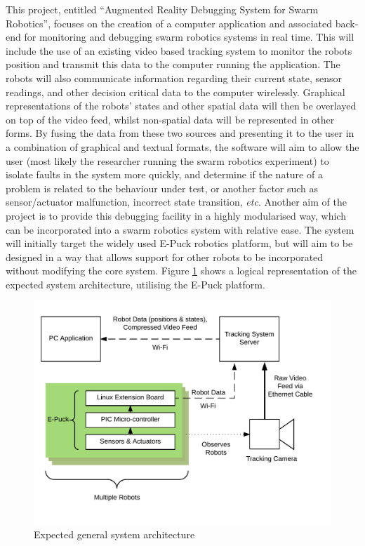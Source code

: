 \documentclass[titlepage,hidelinks,10pt]{article}
\begin{document}
\begin{multicols}{2}
This project, entitled ``Augmented Reality Debugging System for Swarm Robotics'', focuses on the creation of a computer application and associated back-end for monitoring and debugging swarm robotics systems in real time. This will include the use of an existing video based tracking system to monitor the robots position and transmit this data to the computer running the application. The robots will also communicate information regarding their current state, sensor readings, and other decision critical data to the computer wirelessly. Graphical representations of the robots' states and other spatial data will then be overlayed on top of the video feed, whilst non-spatial data will be represented in other forms. By fusing the data from these two sources and presenting it to the user in a combination of graphical and textual formats, the software will aim to allow the user (most likely the researcher running the swarm robotics experiment) to isolate faults in the system more quickly, and determine if the nature of a problem is related to the behaviour under test, or another factor such as sensor/actuator malfunction, incorrect state transition, \textit{etc}. Another aim of the project is to provide this debugging facility in a highly modularised way, which can be incorporated into a swarm robotics system with relative ease. The system will initially target the widely used E-Puck\cite{epuck} robotics platform, but will aim to be designed in a way that allows support for other robots to be incorporated without modifying the core system. Figure \ref{fig:SystemArchitecture} shows a logical representation of the expected system architecture, utilising the E-Puck platform. 
\end{multicols}

\begin{figure}[H]
	\begin{center}
	\includegraphics[scale=0.9]{SystemArchitecture.png}
	\caption{Expected general system architecture}
	\label{fig:SystemArchitecture}
	\end{center}
\end{figure}
\end{document}
